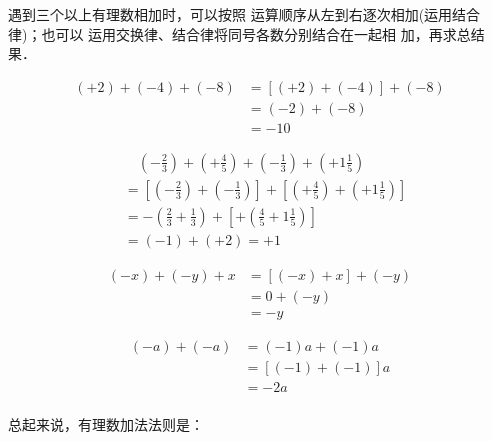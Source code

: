 \begin{analyze}
    遇到三个以上有理数相加时，可以按照
运算顺序从左到右逐次相加(运用结合律)；也可以
运用交换律、结合律将同号各数分别结合在一起相
加，再求总结果．
\end{analyze}


\begin{solution}
\begin{align*}
    (+2)+(-4)+(-8)&= [(+2)+(-4)]+(-8) \tag{结合律}\\
    &=(-2)+(-8) \tag{异号相加法则}\\
    &=-10 \tag{同号相加法则}
\end{align*}

\begin{align*}
  &\quad   \left(-\frac{2}{3}\right)+\left(+\frac{4}{5}\right)+\left(-\frac{1}{3}\right)+\left(+1\frac{1}{5}\right)\\
&=\left[\left(-\frac{2}{3}\right)+\left(-\frac{1}{3}\right)\right]+\left[\left(+\frac{4}{5}\right)+\left(+1\frac{1}{5}\right)\right]  \tag{交换、结合律}\\
&=-\left(\frac{2}{3}+\frac{1}{3}\right)+\left[+\left(\frac{4}{5}+1\frac{1}{5}\right)\right]  \tag{同号加法法则}\\
&=(-1)+(+2)=+1  \tag{异号加法法则}
\end{align*}

\begin{align*}
    (-x)+(-y)+x  &= [(-x)+x]+(-y)  \tag{交换、结合律}\\
    &=0+(-y) \tag{相反数的性质}\\
&=-y \tag{零的特性}
\end{align*}

\begin{align*}
    (-a)+(-a) &= (-1)a+(-1)a  \tag{相反数的意义}\\
    &=[(-1)+(-1)]a  \tag{分配律}\\
    &=-2a  \tag{同号加法法则}\\
\end{align*}
\end{solution}

总起来说，有理数加法法则是：

